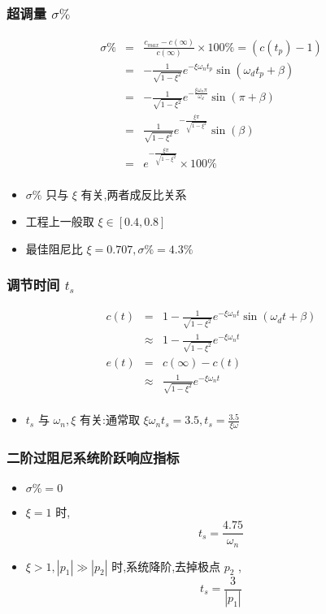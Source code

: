 \documentclass{beamer}
\begin{document}
\begin{frame}
\frametitle{超调量 $\sigma \%$}
\label{sec-3-4}

\begin{eqnarray*}
\sigma \% & = & \frac{c_{max}-c(\infty)}{c(\infty)}\times 100\% 
         = (c(t_p)-1) \\
         &=& -\frac{1}{\sqrt{1-\xi^2}}e^{-\xi\omega_n t_p}\sin(\omega_d t_p+\beta) \\
         &=& -\frac{1}{\sqrt{1-\xi^2}}e^{-\frac{\xi\omega_n\pi}{\omega_d}}\sin(\pi+\beta) \\
         &=& \frac{1}{\sqrt{1-\xi^2}}e^{-\frac{\xi\pi}{\sqrt{1-\xi^2}}}\sin(\beta) \\
         &=& e^{-\frac{\xi\pi}{\sqrt{1-\xi^2}}}\times 100\% \\
\end{eqnarray*}

\begin{itemize}
\item <2->$\sigma\%$ 只与 $\xi$ 有关,两者成反比关系
\item <3->工程上一般取 $\xi\in[0.4,0.8]$
\item <4->最佳阻尼比 $\xi=0.707,\sigma\%=4.3\%$
\end{itemize}
\end{frame}
\begin{frame}
\frametitle{调节时间 $t_s$}
\label{sec-3-5}



\begin{eqnarray*}
c(t) & = & 1-\frac{1}{\sqrt{1-\xi^2}}e^{-\xi\omega_n t}\sin(\omega_d t+\beta)\\
     &\approx & 1-\frac{1}{\sqrt{1-\xi^2}}e^{-\xi\omega_n t} \\
e(t) &=& c(\infty)-c(t) \\
    &\approx& \frac{1}{\sqrt{1-\xi^2}}e^{-\xi\omega_n t}\\ 
\end{eqnarray*}

\begin{itemize}
\item <2-> $t_s$ 与 $\omega_n,\xi$ 有关:通常取 $\xi\omega_n t_s = 3.5,t_s=\frac{3.5}{\xi\omega}$
\end{itemize}
       
\end{frame}
\begin{frame}
\frametitle{二阶过阻尼系统阶跃响应指标}
\label{sec-3-6}

\begin{itemize}
\item <2->$\sigma\%=0$
\item <3->$\xi=1$ 时, 
       \[t_s=\frac{4.75}{\omega_n}\]
\item <4->$\xi>1,|p_1|\gg |p_2|$ 时,系统降阶,去掉极点 $p_2$ , 
      \[t_s=\frac{3}{|p_1|}\]
\end{itemize}
\end{frame}
\end{document}
